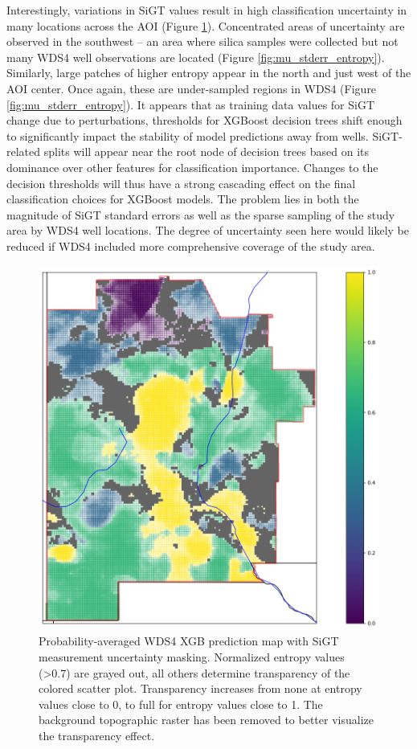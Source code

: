 Interestingly, variations in SiGT values result in high classification uncertainty in many locations across the AOI (Figure \ref{fig:mu_masked_pred_map}). Concentrated areas of uncertainty are observed in the southwest -- an area where silica samples were collected but not many WDS4 well observations are located (Figure \ref{fig:mu_stderr_entropy}). Similarly, large patches of higher entropy appear in the north and just west of the AOI center. Once again, these are under-sampled regions in WDS4 (Figure \ref{fig:mu_stderr_entropy}). It appears that as training data values for SiGT change due to perturbations, thresholds for XGBoost decision trees shift enough to significantly impact the stability of model predictions away from wells. SiGT-related splits will appear near the root node of decision trees based on its dominance over other features for classification importance. Changes to the decision thresholds will thus have a strong cascading effect on the final classification choices for XGBoost models. The problem lies in both the magnitude of SiGT standard errors as well as the sparse sampling of the study area by WDS4 well locations. The degree of uncertainty seen here would likely be reduced if WDS4 included more comprehensive coverage of the study area.

\begin{figure}[!htp]
\centering
\includegraphics[width=.8\textwidth]{templates/images/Figure-MU_Masked_Average_Gradient_Map.png}
\caption[SiGT measurement uncertainty mask on prediction map]
{Probability-averaged WDS4 XGB prediction map with SiGT measurement uncertainty masking. Normalized entropy values (>0.7) are grayed out, all others determine transparency of the colored scatter plot. Transparency increases from none at entropy values close to 0, to full for entropy values close to 1. The background topographic raster has been removed to better visualize the transparency effect.}
\label{fig:mu_masked_pred_map}
\end{figure}

